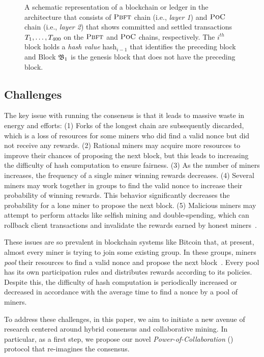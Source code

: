 \begin{figure}[t]
\begin{tikzpicture}[xscale=1.5,list/.style={minimum width=2cm,rectangle split, rectangle split parts=2,draw, rectangle split}]
       \end{tikzpicture}
       \caption{A schematic representation of a blockchain or ledger in the 
       \DualChain{} architecture that consists of $\PBFT{}$ chain (i.e., \textit{layer 1}) 
       and $\PoC{}$ chain (i.e., \textit{layer 2}) that shows committed and settled 
       transactions $\Transaction_1, \dots, \Transaction_{400}$ on the $\PBFT{}$ and  
       $\PoC{}$ chains, respectively. The $i^{th}$ block holds a \emph{hash value} 
       hash$_{i-1}$ that identifies the preceding block and Block $\block_1$ is the  
       genesis block that does not have the preceding block.}
	\label{fig:blockchain}
\end{figure}



\subsection{\PoW{} Challenges}
The key issue with running the \PoW{} consensus is that it leads to massive 
waste in energy and efforts:
(1) Forks of the longest chain are subsequently discarded, which is a loss of 
resources for some miners who did find a valid nonce but did not receive any rewards.
(2) Rational miners may acquire more resources to improve their chances of proposing 
the next block, but this leads to increasing the difficulty of hash computation to 
ensure fairness.
(3) As the number of miners increases, the frequency of a single miner winning rewards 
decreases. 
(4) Several miners may work together in groups to find the valid nonce to increase 
their probability of winning rewards. This behavior significantly decreases the 
probability for a lone miner to propose the next block.
(5) Malicious miners may attempt to perform attacks like selfish mining and 
double-spending, which can rollback client transactions and invalidate the rewards earned 
by honest miners~\cite{blockchain-book}.

These issues are so prevalent in blockchain systems like Bitcoin that, 
at present, almost every miner is trying to join some existing group. In these 
groups, miners {\em pool} their resources to find a valid nonce and propose the 
next block~\cite{pooled-mining}. Every pool has its own participation rules and 
distributes rewards according to its policies. Despite this, the difficulty of hash 
computation is periodically increased or decreased in accordance with the average 
time to find a nonce by a pool of miners.

To address these challenges, in this paper, we aim to initiate a new avenue of research 
centered around hybrid consensus and collaborative mining. In particular, as a first step,
we propose our novel {\em Power-of-Collaboration} (\PoC) protocol that re-imagines 
the \PoW{} consensus.
